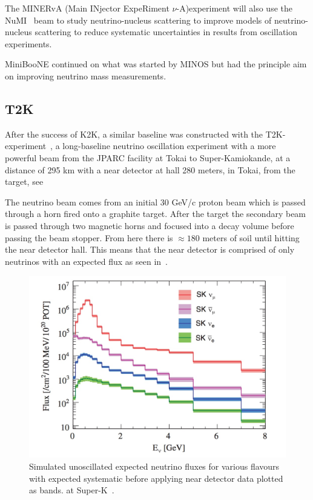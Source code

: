 The MINERvA (Main INjector ExpeRiment $\nu$-A)experiment \cite{39minerva} will also use the NuMI~\cite{19NuMI} beam to study neutrino-nucleus scattering to improve models of neutrino-nucleus scattering to reduce systematic uncertainties in results from oscillation experiments.

MiniBooNE\cite{41MiniBooNE} continued on what was started by MINOS but had the principle aim on improving neutrino mass measurements.

\subsection{T2K}


After the success of K2K, a similar baseline was constructed with the T2K-experiment~\cite{21T2K},  a long-baseline neutrino oscillation experiment with a more powerful beam from the JPARC facility at Tokai to Super-Kamiokande, at a distance of 295 km with a near detector at hall 280 meters, in Tokai, from the target, see~

The neutrino beam comes from an initial 30 GeV/c proton beam which is passed through a horn fired onto a graphite target. After the target the secondary beam is passed through two magnetic horns and focused into a decay volume before passing the beam stopper. From here there is $\approx180$ meters of soil until hitting the near detector hall. This means that the near detector is comprised of only neutrinos with an expected flux as seen in~. 

\begin{figure}[h!]
\centering
  \centering
\includegraphics[width=\textwidth]{figures/ND280Flux.jpeg}
\vspace{2mm}
\caption{Simulated unoscillated expected neutrino fluxes for various flavours with expected systematic before applying near detector data plotted as bands. at Super-K~\cite{21T2K}.}
\label{fig:ND280Flux}
\end{figure}

